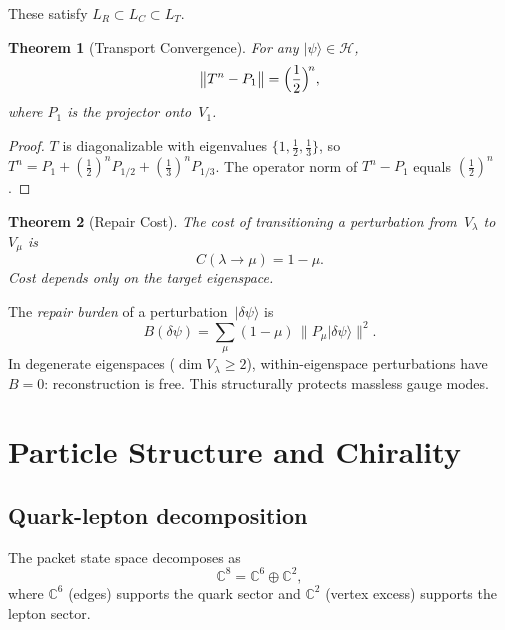 \documentclass[%
 aip,
 amsmath,amssymb,
 reprint,%
]{revtex4-1}
\newtheorem{theorem}{Theorem}
\newcommand{\half}{\tfrac{1}{2}}
\newcommand{\third}{\tfrac{1}{3}}
\newcommand{\CC}{\mathbb{C}}
\newcommand{\HH}{\mathcal{H}}
\newcommand{\Vone}{V_1}
\begin{document}
These satisfy $L_R\subset L_C\subset L_T$.

\begin{theorem}[Transport Convergence]\label{thm:convergence}
For any $|\psi\rangle\in\HH$,
\begin{equation}\label{eq:convergence}
\bigl\|T^n-P_1\bigr\|=\Bigl(\frac{1}{2}\Bigr)^{\!n},
\end{equation}
where $P_1$ is the projector onto~$\Vone$.
\end{theorem}

\begin{proof}
$T$ is diagonalizable with eigenvalues $\{1,\half,\third\}$, so $T^n=P_1+(\half)^n P_{1/2}+(\third)^n P_{1/3}$. The operator norm of $T^n-P_1$ equals $(\half)^n$.
\end{proof}

\begin{theorem}[Repair Cost]\label{thm:repair}
The cost of transitioning a perturbation from~$V_\lambda$ to~$V_\mu$ is
\begin{equation}\label{eq:repair_cost}
C(\lambda\to\mu)=1-\mu.
\end{equation}
Cost depends only on the target eigenspace.
\end{theorem}

The \emph{repair burden} of a perturbation~$|\delta\psi\rangle$ is
\begin{equation}\label{eq:burden}
B(\delta\psi)=\sum_\mu(1-\mu)\,\|P_\mu|\delta\psi\rangle\|^2.
\end{equation}
In degenerate eigenspaces ($\dim V_\lambda\geq2$), within-eigenspace perturbations have $B=0$: reconstruction is free. This structurally protects massless gauge modes.


\section{\label{sec:particles}Particle Structure and Chirality}

\subsection{\label{ssec:ql}Quark-lepton decomposition}

The packet state space decomposes as
\begin{equation}\label{eq:ql_split}
\CC^8=\CC^6\oplus\CC^2,
\end{equation}
where $\CC^6$ (edges) supports the quark sector and $\CC^2$ (vertex excess) supports the lepton sector.
\end{document}
